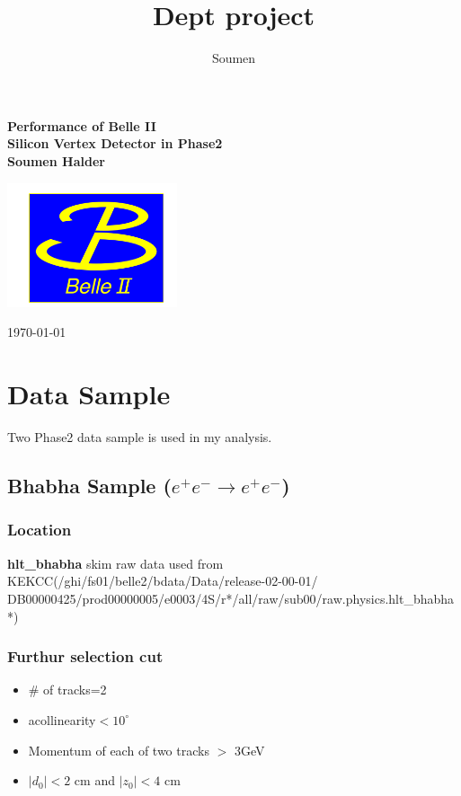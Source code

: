 \documentclass[12pt]{article}
\title{Dept project}
\author{Soumen}
\begin{document}
\begin{titlepage}
	\centering

	{\huge\bfseries  Performance of Belle II }
	\\	\vspace{4mm}
	{\huge\bfseries Silicon Vertex Detector in Phase2 }\\
	\vspace{2cm}
		{\huge\bfseries Soumen Halder }\\
		\vspace{2cm}
	
	\includegraphics[width = 50mm]{belle2.png}
	
	
	\vfill
	
	\vfill		
	{\large \today\par}
\end{titlepage}
	\tableofcontents
	\pagebreak
    \section{Data Sample} Two Phase2 data sample is used in my analysis.
     \subsection{Bhabha Sample ($e^+ e^-\rightarrow e^+ e^-$)}
     \subsubsection{Location} \textbf{hlt\_bhabha} skim raw data used from KEKCC(/ghi/fs01/belle2/bdata/Data/release-02-00-01/\\DB00000425/prod00000005/e0003/4S/r*/all/raw/sub00/raw.physics.hlt\_bhabha*) 
     \subsubsection{Furthur selection cut}
     	
     	  \begin{itemize}
     	  	\item \# of tracks=2
     	  	
     	  	\item acollinearity$<10^{\circ}$
     	  	\item Momentum of each of two tracks $>$ 3GeV 
     	  	\item $|d_0|<2$ cm and $|z_0|<4$ cm		
     	  \end{itemize}
     
\end{document}
